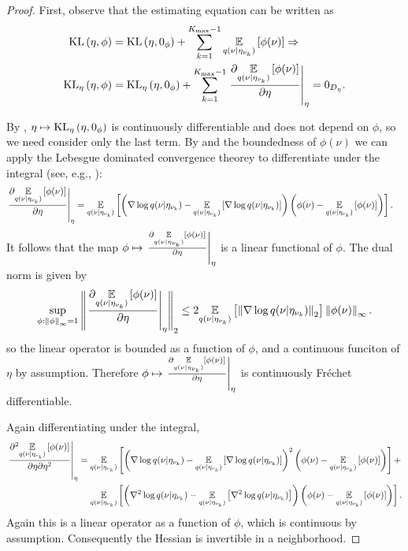 \begin{thm}
\begin{proof}
First, observe that the estimating equation can be written as
%
\begin{align*}
%
\KL{\eta, \phi} ={}&
    \KL{\eta, \phiz} + \sumkm \expect{\q(\nu \vert \etanuk)}{\phi(\nu)}
    \Rightarrow \\
%
\KLgrad{\eta, \phi} ={}&
\KLgrad{\eta, \phiz} +
    \sumkm \fracat{\partial \expect{\q(\nu \vert \etanuk)}
                  {\phi(\nu)}}{\partial \eta}{\eta}
= 0_\etadim.
%
\end{align*}

By , $\eta \mapsto \mathrm{KL}_{\eta}\left(\eta, 0_\phi\right)$ is continuously
differentiable and does not depend on $\phi$, so we need consider only the last
term.  By  and the boundedness of $\phi(\nu)$ we can apply
the Lebesgue dominated convergence theorey to differentiate under the integral
(see, e.g., \citet[Theorem 1]{giordano:2018:covariances}):
%
\begin{align*}
%
\fracat{\partial \expect{\q(\nu \vert \etanuk)}
              {\phi(\nu)}}{\partial \eta}{\eta} ={}&
\expect{\q(\nu \vert \etanuk)}
       {\left(\nabla \log \q(\nu \vert \etanuk)
         - \expect{\q(\nu \vert \etanuk)}
                  {\nabla \log \q(\nu \vert \etanuk)}
       \right)
       \left( \phi(\nu) - \expect{\q(\nu \vert \etanuk)}{\phi(\nu)} \right)}.
%
\end{align*}
%
It follows that the map $\phi \mapsto \left.\frac{\partial \underset{q(\nu \vert
\eta_{\nu_{k}})}{\mathbb{E}}\left[\phi(\nu)\right]}{\partial \eta}\right\vert_{\eta}$ is a linear functional of
$\phi$.  The dual norm is given by
%
\begin{align*}
%
\sup_{\phi: \norminf{\phi} = 1}
    \norm{\fracat{\partial \expect{\q(\nu \vert
    \etanuk)} {\phi(\nu)}}{\partial \eta}{\eta}}_2 \le
    2 \expect{\q(\nu \vert \etanuk)}
             {\norm{\nabla \log \q(\nu \vert \etanuk)}_2}
              \norminf{\phi(\nu)}.
%
\end{align*}
%
so the linear operator is bounded as a function of $\phi$, and a continuous
funciton of $\eta$ by assumption.  Therefore $\phi \mapsto \left.\frac{\partial
\underset{q(\nu \vert \eta_{\nu_{k}})}{\mathbb{E}}\left[\phi(\nu)\right]}{\partial \eta}\right\vert_{\eta}$ is
continuously Fr{\'e}chet differentiable.

Again differentiating under the integral,
%
\begin{align*}
%
\fracat{\partial^2 \expect{\q(\nu \vert \etanuk)}
              {\phi(\nu)}}{\partial \eta \partial \eta^2}{\eta} ={}&
\expect{\q(\nu \vert \etanuk)}
       {\left(\nabla \log \q(\nu \vert \etanuk)
         - \expect{\q(\nu \vert \etanuk)}
                  {\nabla \log \q(\nu \vert \etanuk)}
       \right)^2
       \left( \phi(\nu) - \expect{\q(\nu \vert \etanuk)}{\phi(\nu)} \right)} +
\\&
\expect{\q(\nu \vert \etanuk)}{
       \left(                            \nabla^2 \log \q(\nu \vert \etanuk)
        - \expect{\q(\nu \vert \etanuk)}{\nabla^2 \log \q(\nu \vert \etanuk)}
       \right)
       \left( \phi(\nu) - \expect{\q(\nu \vert \etanuk)}{\phi(\nu)} \right)
       }.
%
\end{align*}
%
Again this is a linear operator as a function of $\phi$, which is continuous by
assumption.  Consequently the Hessian is invertible in a neighborhood.


\end{proof}
\end{thm}
